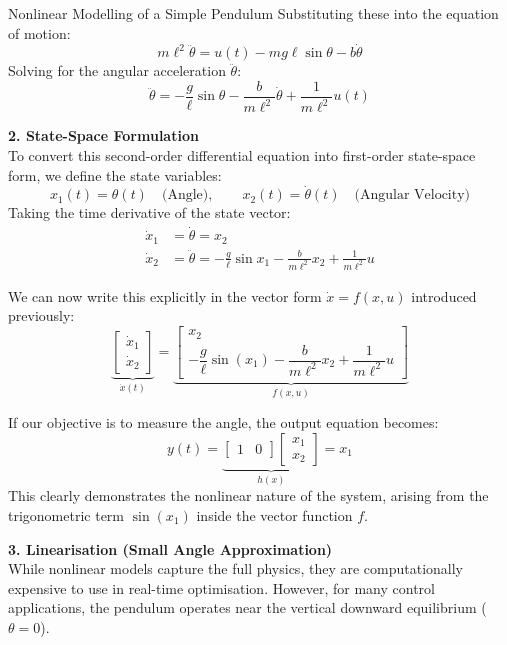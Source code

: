 \begin{examplebox}{Nonlinear Modelling of a Simple Pendulum}
	Substituting these into the equation of motion:
	\[
	m\ell^2 \ddot{\theta} = u(t) - mg\ell \sin\theta - b \dot{\theta}
	\]
	Solving for the angular acceleration $\ddot{\theta}$:
	\begin{equation*}
		\ddot{\theta} = -\frac{g}{\ell} \sin\theta - \frac{b}{m\ell^2} \dot{\theta} + \frac{1}{m\ell^2} u(t)
	\end{equation*}
	
	\textbf{2. State-Space Formulation} \\
	To convert this second-order differential equation into first-order state-space form, we define the state variables:
	\[
	x_1(t) = \theta(t) \quad \text{(Angle)}, \qquad x_2(t) = \dot{\theta}(t) \quad \text{(Angular Velocity)}
	\]
	Taking the time derivative of the state vector:
	\begin{align*}
		\dot{x}_1 &= \dot{\theta} = x_2 \\
		\dot{x}_2 &= \ddot{\theta} = -\frac{g}{\ell} \sin x_1 - \frac{b}{m\ell^2} x_2 + \frac{1}{m\ell^2} u
	\end{align*}
	
	We can now write this explicitly in the vector form $\dot{x} = f(x, u)$ introduced previously:
	\begin{equation}
		\underbrace{\begin{bmatrix} \dot{x}_1 \\[10pt] \dot{x}_2 \end{bmatrix}}_{\dot{x}(t)} 
		= 
		\underbrace{\begin{bmatrix} 
				x_2 \\[10pt]
				-\dfrac{g}{\ell} \sin(x_1) - \dfrac{b}{m\ell^2} x_2 + \dfrac{1}{m\ell^2} u 
		\end{bmatrix}}_{f(x, u)}
	\end{equation}
	
	If our objective is to measure the angle, the output equation becomes:
	\[
	y(t) = \underbrace{\begin{bmatrix} 1 & 0 \end{bmatrix} \begin{bmatrix} x_1 \\ x_2 \end{bmatrix}}_{h(x)} = x_1
	\]
	This clearly demonstrates the nonlinear nature of the system, arising from the trigonometric term $\sin(x_1)$ inside the vector function $f$.
	
	\textbf{3. Linearisation (Small Angle Approximation)} \\
	While nonlinear models capture the full physics, they are computationally expensive to use in real-time optimisation. However, for many control applications, the pendulum operates near the vertical downward equilibrium ($\theta = 0$).
	

\end{examplebox}
